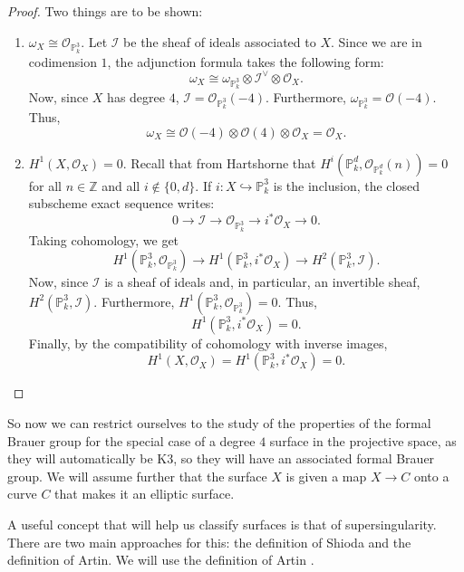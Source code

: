 \documentclass{report}
\theoremstyle{definition}
\begin{document}
\begin{proof}
Two things are to be shown:
\begin{enumerate}
\item $\omega_X\cong\mathcal{O}_{\mathbb{P}_k^3}$. Let $\mathcal{I}$ be the sheaf of ideals associated to $X$. Since we are in codimension $1$, the adjunction formula takes the following form:
\[\omega_X\cong\omega_{\mathbb{P}_k^3}\otimes\mathcal{I}^{\vee}\otimes\mathcal{O}_X.\]
Now, since $X$ has degree $4$, $\mathcal{I}=\mathcal{O}_{\mathbb{P}_k^3}(-4)$. Furthermore, $\omega_{\mathbb{P}_k^3}=\mathcal{O}(-4)$. Thus,
\[\omega_X\cong\mathcal{O}(-4)\otimes\mathcal{O}(4)\otimes\mathcal{O}_X=\mathcal{O}_X.\]

\item $H^1(X,\mathcal{O}_X)=0$. Recall that from Hartshorne \cite[Theorem~III.5.1]{hartshorne2013algebraic} that $H^i(\mathbb{P}_k^d,\mathcal{O}_{\mathbb{P}_k^d}(n))=0$ for all $n\in\mathbb{Z}$ and all $i\notin\{0,d\}$. If $i:X\hookrightarrow\mathbb{P}_k^3$ is the inclusion, the closed subscheme exact sequence writes:
\[0\longrightarrow\mathcal{I}\longrightarrow\mathcal{O}_{\mathbb{P}_k^3}\longrightarrow i^*\mathcal{O}_X\longrightarrow0.\]
Taking cohomology, we get
\[H^1(\mathbb{P}_k^3,\mathcal{O}_{\mathbb{P}_k^3})\longrightarrow H^1(\mathbb{P}_k^3,i^*\mathcal{O}_X)\longrightarrow H^2(\mathbb{P}_k^3,\mathcal{I}).\]
Now, since $\mathcal{I}$ is a sheaf of ideals and, in particular, an invertible sheaf, $H^2(\mathbb{P}_k^3,\mathcal{I})$. Furthermore, $H^1(\mathbb{P}_k^3,\mathcal{O}_{\mathbb{P}_k^3})=0$. Thus,
\[H^1(\mathbb{P}_k^3,i^*\mathcal{O}_X)=0.\]
Finally, by the compatibility of cohomology with inverse images,
\[H^1(X,\mathcal{O}_X)=H^1(\mathbb{P}_k^3,i^*\mathcal{O}_X)=0.\]
\end{enumerate}
\end{proof}

So now we can restrict ourselves to the study of the properties of the formal Brauer group for the special case of a degree $4$ surface in the projective space, as they will automatically be K3, so they will have an associated formal Brauer group. We will assume further that the surface $X$ is given a map $X\rightarrow C$ onto a curve $C$ that makes it an elliptic surface.

A useful concept that will help us classify surfaces is that of supersingularity. There are two main approaches for this: the definition of Shioda and the definition of Artin. We will use the definition of Artin \cite[Definition~0.3]{artin1974supersingular}.
\end{document}
